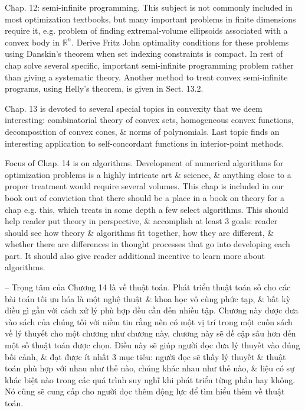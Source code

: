 \documentclass{article}
\begin{document}
\begin{itemize}
    Chap. 12: semi-infinite programming. This subject is not commonly included in most optimization textbooks, but many important problems in finite dimensions require it, e.g. problem of finding extremal-volume ellipsoids associated with a convex body in $\mathbb{R}^n$. Derive Fritz John optimality conditions for these problems using Danskin's theorem when set indexing constraints is compact. In rest of chap solve several specific, important semi-infinite programming problem rather than giving a systematic theory. Another method to treat convex semi-infinite programs, using Helly's theorem, is given in Sect. 13.2.

    Chap. 13 is devoted to several special topics in convexity that we deem interesting: combinatorial theory of convex sets, homogeneous convex functions, decomposition of convex cones, \& norms of polynomials. Last topic finds an interesting application to self-concordant functions in interior-point methods.

    Focus of Chap. 14 is on algorithms. Development of numerical algorithms for optimization problems is a highly intricate art \& science, \& anything close to a proper treatment would require several volumes. This chap is included in our book out of conviction that there should be a place in a book on theory for a chap e.g. this, which treats in some depth a few select algorithms. This should help reader put theory in perspective, \& accomplish at least 3 goals: reader should see how theory \& algorithms fit together, how they are different, \& whether there are differences in thought processes that go into developing each part. It should also give reader additional incentive to learn more about algorithms.

    -- Trọng tâm của Chương 14 là về thuật toán. Phát triển thuật toán số cho các bài toán tối ưu hóa là một nghệ thuật \& khoa học vô cùng phức tạp, \& bất kỳ điều gì gần với cách xử lý phù hợp đều cần đến nhiều tập. Chương này được đưa vào sách của chúng tôi với niềm tin rằng nên có một vị trí trong một cuốn sách về lý thuyết cho một chương như chương này, chương này sẽ đề cập sâu hơn đến một số thuật toán được chọn. Điều này sẽ giúp người đọc đưa lý thuyết vào đúng bối cảnh, \& đạt được ít nhất 3 mục tiêu: người đọc sẽ thấy lý thuyết \& thuật toán phù hợp với nhau như thế nào, chúng khác nhau như thế nào, \& liệu có sự khác biệt nào trong các quá trình suy nghĩ khi phát triển từng phần hay không. Nó cũng sẽ cung cấp cho người đọc thêm động lực để tìm hiểu thêm về thuật toán.


\end{itemize}
\end{document}

